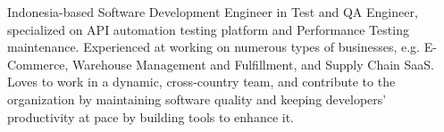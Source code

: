 

\begin{cvparagraph}

Indonesia-based Software Development Engineer in Test and QA Engineer, specialized on API automation testing platform and Performance Testing maintenance. Experienced at working on numerous types of businesses, e.g. E-Commerce, Warehouse Management and Fulfillment, and Supply Chain SaaS.
\newline Loves to work in a dynamic, cross-country team, and contribute to the organization by maintaining software quality and keeping developers' productivity at pace by building tools to enhance it.
\end{cvparagraph}
